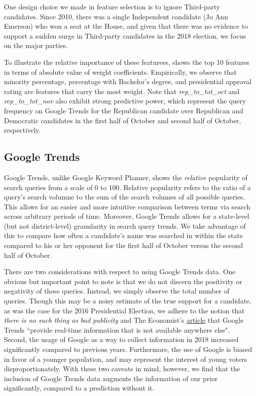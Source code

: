\documentclass[12pt, letterpaper]{article}
\begin{document}
One design choice we made in feature selection is to ignore Third-party candidates. Since 2010, there was a single Independent candidate (Jo Ann Emerson) who won a seat at the House, and given that there was no evidence to support a sudden surge in Third-party candidates in the 2018 election, we focus on the major parties.

To illustrate the relative importance of these featurees,  shows the top 10
features in terms of absolute value of weight coefficients. Empirically, we observe that minority percentage, percentage with Bachelor's degree, and presidential approval rating are features that carry the most weight. Note that \textit{rep\_to\_tot\_oct} and \textit{rep\_to\_tot\_nov} also exhibit strong predictive power, which represent the query frequency on Google Trends for the Republican candidate over Republican and Democratic candidates in the first half of October and second half of October, respectively.

\subsection{Google Trends}
Google Trends, unlike Google Keyword Planner, shows the \textit{relative} popularity of search queries from a scale of 0 to 100. Relative popularity refers to the ratio of a query's search volumne to the sum of the search volumes of all possible queries. This allows for an easier and more intuitive comparison between terms via search across arbitrary periods of time. Moreover, Google Trends allows for a state-level (but not district-level) granularity in search query trends. We take advantage of this to compare how often a candidate's name was searched in within the state compared to his or her opponent for the first half of October versus the second half of October.

There are two considerations with respect to using Google Trends data. One
obvious but important point to note is that we do not discern the positivity or
negativity of these queries. Instead, we simply observe the total number of
queries. Though this may be a noisy estimate of the true support for a
candidate, as was the case for the 2016 Presidential Election, we adhere to the
notion that \textit{there is no such thing as bad publicity} \citep{berger2010positive} and The Economist's
\href{https://www.economist.com/graphic-detail/2016/03/01/how-useful-is-google-search-data-when-predicting-primary-elections}{article} that Google Trends ``provide real-time information that is not available
anywhere else". Second, the usage of Google as a way to collect information in 2018 increased significantly compared to previous years. Furthermore, the use of Google is biased in favor of a younger population, and may represent the interest of young voters disproportionately. With these two caveats in mind, however, we find that the inclusion of Google Trends data augments the information of our prior significantly, compared to a prediction without it.
\end{document}
